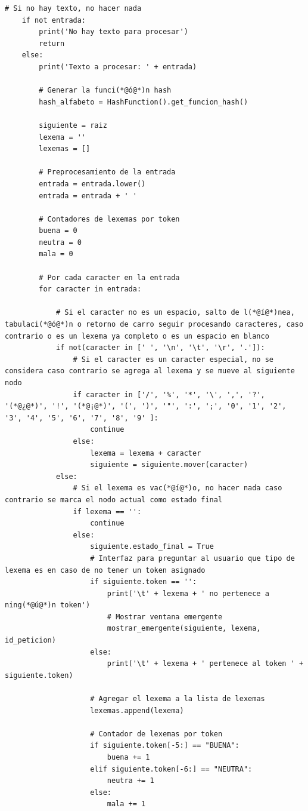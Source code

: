 \documentclass[10pt,times,twocolumn]{article}
\begin{document}
\begin{lstlisting}[caption={Core del análisis. Procesar}, xleftmargin=0.05\textwidth]
    # Si no hay texto, no hacer nada
    if not entrada:
        print('No hay texto para procesar')
        return
    else:
        print('Texto a procesar: ' + entrada)

        # Generar la funci(*@ó@*)n hash
        hash_alfabeto = HashFunction().get_funcion_hash()

        siguiente = raiz
        lexema = ''
        lexemas = []

        # Preprocesamiento de la entrada
        entrada = entrada.lower()
        entrada = entrada + ' '

        # Contadores de lexemas por token
        buena = 0
        neutra = 0
        mala = 0

        # Por cada caracter en la entrada
        for caracter in entrada:
            
            # Si el caracter no es un espacio, salto de l(*@í@*)nea, tabulaci(*@ó@*)n o retorno de carro seguir procesando caracteres, caso contrario o es un lexema ya completo o es un espacio en blanco 
            if not(caracter in [' ', '\n', '\t', '\r', '.']):
                # Si el caracter es un caracter especial, no se considera caso contrario se agrega al lexema y se mueve al siguiente nodo
                if caracter in ['/', '%', '*', '\', ',', '?', '(*@¿@*)', '!', '(*@¡@*)', '(', ')', '"', ':', ';', '0', '1', '2', '3', '4', '5', '6', '7', '8', '9' ]:
                    continue
                else:
                    lexema = lexema + caracter
                    siguiente = siguiente.mover(caracter)
            else:
                # Si el lexema es vac(*@í@*)o, no hacer nada caso contrario se marca el nodo actual como estado final
                if lexema == '':
                    continue
                else:
                    siguiente.estado_final = True
                    # Interfaz para preguntar al usuario que tipo de lexema es en caso de no tener un token asignado
                    if siguiente.token == '':
                        print('\t' + lexema + ' no pertenece a ning(*@ú@*)n token')
                        # Mostrar ventana emergente
                        mostrar_emergente(siguiente, lexema, id_peticion)
                    else:
                        print('\t' + lexema + ' pertenece al token ' + siguiente.token)

                    # Agregar el lexema a la lista de lexemas
                    lexemas.append(lexema)
                    
                    # Contador de lexemas por token
                    if siguiente.token[-5:] == "BUENA":
                        buena += 1
                    elif siguiente.token[-6:] == "NEUTRA":
                        neutra += 1
                    else:
                        mala += 1
                    

\end{lstlisting}
\end{document}
